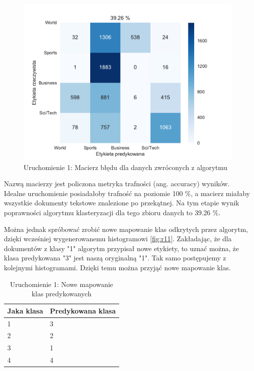     \begin{figure}[h!]
        \centering
        \includegraphics[scale=0.6]{Rysunki/Rozdzial3/run12.pdf}
        \caption{Uruchomienie 1: Macierz błędu dla danych zwróconych z algorytmu}
        \label{fig:r12}
    \end{figure}
    
    \newpage
    Nazwą macierzy jest policzona metryka trafności (ang. accuracy) wyników. Idealne uruchomienie posiadałoby trafność na poziomie 100 \%, a macierz miałaby wszystkie dokumenty tekstowe znalezione po przekątnej. Na tym etapie wynik poprawności algorytmu klasteryzacji dla tego zbioru danych to 39.26 \%. 
    
    Można jednak spróbować zrobić nowe mapowanie klas odkrytych przez algorytm, dzięki wcześniej wygenerowanemu histogramowi \ref{fig:r11}. Zakładając, że dla dokumentów z klasy "1" algorytm przypisał nowe etykiety, to uznać można, że klasa predykowana "3" jest naszą oryginalną "1". Tak samo postępujemy z kolejnymi histogramami. Dzięki temu można przyjąć nowe mapowanie klas. 
    
    \begin{table}[h!]
        \centering
        \caption{Uruchomienie 1: Nowe mapowanie klas predykowanych}
        \label{newMapPred}
        \begin{tabular}{|l|l|}
        \hline
        Jaka klasa & Predykowana klasa \\ \hline
        1          & 3                 \\ \hline
        2          & 2                 \\ \hline
        3          & 1                 \\ \hline
        4          & 4                 \\ \hline
        \end{tabular}
    \end{table}
    
